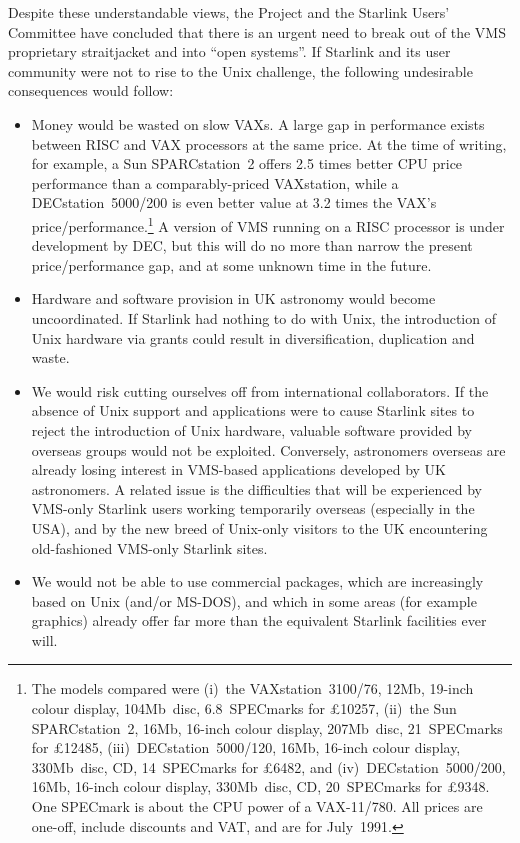 Despite these understandable views, the Project and the Starlink Users'
Committee have concluded that there is an urgent need to break out of
the VMS proprietary straitjacket and into ``open systems''.  If Starlink
and its user community were not to rise to the Unix challenge, the
following undesirable consequences would follow:
\begin{itemize}
\item Money would be wasted on slow VAXs.  A large gap in performance
exists between RISC and VAX processors at the same price.  At the time
of writing, for example, a Sun SPARCstation~2 offers 2.5 times better
CPU price performance than a comparably-priced VAXstation, while a
DECstation~5000/200 is even better value at 3.2 times the VAX's
price/performance.\footnote{The models compared were
(i)~the VAXstation~3100/76, 12Mb, 19-inch colour display, 104Mb~disc,
6.8~SPECmarks for \pounds10257,
(ii)~the Sun SPARCstation~2, 16Mb, 16-inch colour display, 207Mb~disc,
21~SPECmarks for \pounds12485,
(iii)~DECstation~5000/120, 16Mb, 16-inch colour display, 330Mb~disc, CD,
14~SPECmarks for \pounds6482, and
(iv)~DECstation~5000/200, 16Mb, 16-inch colour display, 330Mb~disc, CD,
20~SPECmarks for \pounds9348.  One SPECmark is about the CPU power
of a VAX-11/780.
All prices are one-off, include discounts and VAT, and are for
July~1991.}  A version of VMS running on a RISC processor is under
development by DEC, but this will do no more than narrow the present
price/performance gap, and at some unknown time in the future.
\item Hardware and software provision in UK astronomy would become
uncoordinated.  If Starlink had nothing to do with Unix, the
introduction of Unix hardware via grants could result in
diversification, duplication and waste.
\item We would risk cutting ourselves off from international
collaborators.  If the absence of Unix support and applications were to
cause Starlink sites to reject the introduction of Unix hardware,
valuable software provided by overseas groups would not be exploited.
Conversely, astronomers overseas are already losing interest in
VMS-based applications developed by UK astronomers.  A related issue is
the difficulties that will be experienced by VMS-only Starlink users
working temporarily overseas (especially in the USA), and by the new
breed of Unix-only visitors to the UK encountering old-fashioned
VMS-only Starlink sites.
\item We would not be able to use commercial packages, which are
increasingly based on Unix (and/or MS-DOS), and which in some areas
(for example graphics) already offer far more than the equivalent
Starlink facilities ever will.
\end{itemize}


